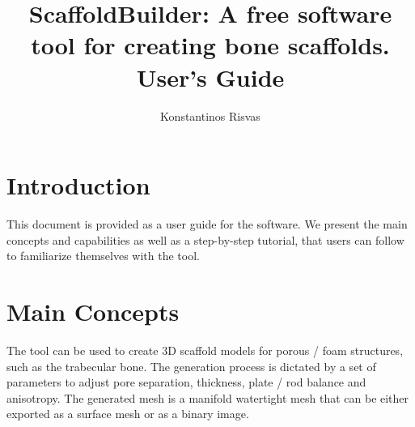 \documentclass[11pt]{article}
\begin{document}
\title{ScaffoldBuilder: A free software tool for creating bone scaffolds. \\ User's Guide}
\author{Konstantinos Risvas}

\maketitle

\section{Introduction}
This document is provided as a user guide for the software. We present the main concepts and capabilities as well as a step-by-step tutorial, that users can follow to familiarize themselves with the tool. 

\section{Main Concepts}

The tool can be used to create 3D scaffold models for porous / foam structures, such as the trabecular bone. The generation process is dictated by a set of parameters to adjust pore separation, thickness, plate / rod balance and anisotropy. The generated mesh is a manifold watertight mesh that can be either exported as a surface mesh or as a binary image.
\end{document}
